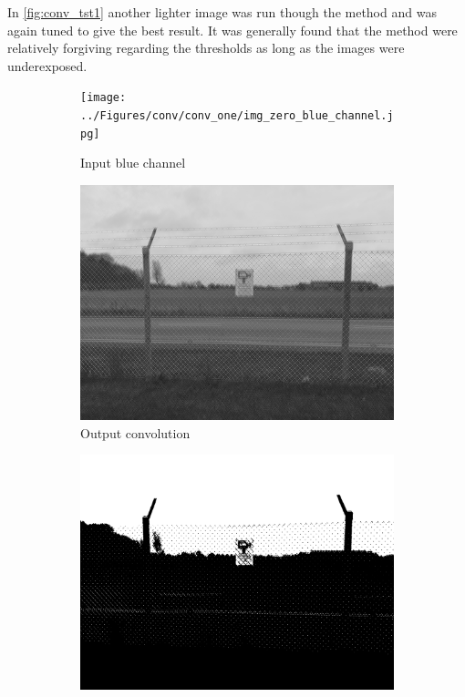 \documentclass[../Head/Main.tex]{subfiles}
\begin{document}
\vspace{-15pt}
In \autoref{fig:conv_tst1} another lighter image was run though the method and was again tuned to give the best result. It was generally found that the method were relatively forgiving regarding the thresholds as long as the images were underexposed.

\begin{figure}[H]
    \centering
    \begin{subfigure}{0.24\textwidth}
        \centering
        \texttt{[image: ../Figures/conv/conv\_one/img\_zero\_blue\_channel.jpg]}
        \caption{Input blue channel}
        \label{fig:conv_tst1_blue}
    \end{subfigure}
    \hfill
    \begin{subfigure}{0.24\textwidth}
        \centering
        \includegraphics[width=\textwidth]{../Figures/conv/conv_one/img_one_conv.jpg}
        \caption{Output convolution}
        \label{fig:conv_tst1_conv}
    \end{subfigure}
    \hfill
    \begin{subfigure}{0.24\textwidth}
        \centering
        \includegraphics[width=\textwidth]{../Figures/conv/conv_one/img_two_threshold.jpg}

\end{subfigure}
\end{figure}
\end{document}
